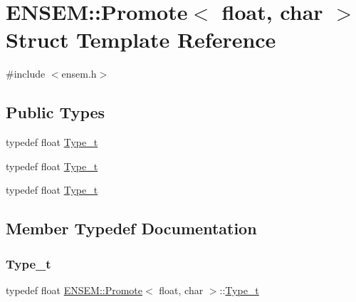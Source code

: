 \hypertarget{structENSEM_1_1Promote_3_01float_00_01char_01_4}{}\section{E\+N\+S\+EM\+:\+:Promote$<$ float, char $>$ Struct Template Reference}
\label{structENSEM_1_1Promote_3_01float_00_01char_01_4}


{\ttfamily \#include $<$ensem.\+h$>$}

\subsection*{Public Types}
\begin{DoxyCompactItemize}
\item 
typedef float \mbox{\hyperlink{structENSEM_1_1Promote_3_01float_00_01char_01_4_a6bd3d2b4d1e7c3dca5835b3bcaa5be9f}{Type\+\_\+t}}
\item 
typedef float \mbox{\hyperlink{structENSEM_1_1Promote_3_01float_00_01char_01_4_a6bd3d2b4d1e7c3dca5835b3bcaa5be9f}{Type\+\_\+t}}
\item 
typedef float \mbox{\hyperlink{structENSEM_1_1Promote_3_01float_00_01char_01_4_a6bd3d2b4d1e7c3dca5835b3bcaa5be9f}{Type\+\_\+t}}
\end{DoxyCompactItemize}


\subsection{Member Typedef Documentation}
\mbox{\label{structENSEM_1_1Promote_3_01float_00_01char_01_4_a6bd3d2b4d1e7c3dca5835b3bcaa5be9f}} 
\subsubsection{\texorpdfstring{Type\_t}{Type\_t}\hspace{0.1cm}{\footnotesize\ttfamily [1/3]}}
{\footnotesize\ttfamily typedef float \mbox{\hyperlink{structENSEM_1_1Promote}{E\+N\+S\+E\+M\+::\+Promote}}$<$ float, char $>$\+::\mbox{\hyperlink{structENSEM_1_1Promote_3_01float_00_01char_01_4_a6bd3d2b4d1e7c3dca5835b3bcaa5be9f}{Type\+\_\+t}}}


